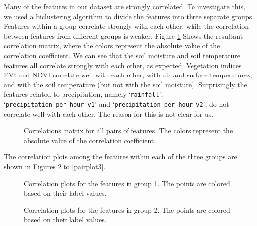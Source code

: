 \documentclass[10pt,parskip=half,
toc=sectionentrywithdots,
bibliography=totocnumbered,
captions=tableheading,numbers=noendperiod]{scrartcl}
\begin{document}
Many of the features in our dataset are strongly correlated. To
investigate this, we used a
\href{https://scikit-learn.org/stable/modules/biclustering.html}{biclustering
algorithm} to divide the features into three separate groups. Features
within a group correlate strongly with each other, while the correlation
between features from different groups is weaker. Figure \ref{corr_mat}
Shows the resultant correlation matrix, where the colors represent the
absolute value of the correlation coefficient. We can see that the soil
moisture and soil temperature features all correlate strongly with each
other, as expected. Vegetation indices EVI and NDVI correlate well with
each other, with air and surface temperatures, and with the soil
temperature (but not with the soil moisture). Surprisingly the features
related to precipitation, namely `\texttt{rainfall}',
`\texttt{precipitation\_per\_hour\_v1}' and
`\texttt{precipitation\_per\_hour\_v2}', do not correlate well with each
other. The reason for this is not clear for us.

\begin{figure}[H]\begin{center}\end{center}\caption{Correlations matrix for all pairs of features. The colors represent the
absolute value of the correlation coefficient.}\label{corr_mat}\end{figure}

The correlation plots among the features within each of the three groups
are shown in Figures \ref{pairplot1} to \ref{pairplot3}.

\begin{figure}[H]\begin{center}\end{center}\caption{Correlation plots for the features in group 1. The points are colored
based on their label values.}\label{pairplot1}\end{figure}

\begin{figure}[H]\begin{center}\end{center}\caption{Correlation plots for the features in group 2. The points are colored
based on their label values.}\label{pairplot2}\end{figure}
\end{document}
